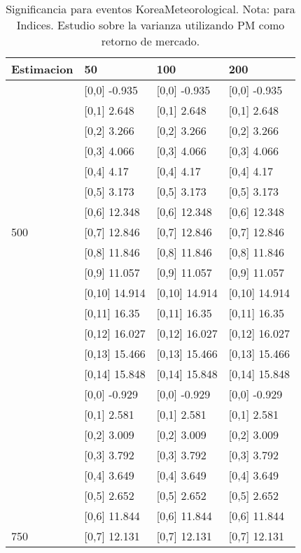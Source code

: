 \begin{table}

\caption{Significancia para eventos KoreaMeteorological. Nota: para Indices. Estudio sobre la varianza utilizando PM como retorno de mercado.}
\centering
\begin{tabular}[t]{llll}
\toprule
Estimacion & 50 & 100 & 200\\
\midrule
 & {}[0,0] -0.935 & {}[0,0] -0.935 & {}[0,0] -0.935\\
 & {}[0,1] 2.648 & {}[0,1] 2.648 & {}[0,1] 2.648\\
 & {}[0,2] 3.266 & {}[0,2] 3.266 & {}[0,2] 3.266\\
 & {}[0,3] 4.066 & {}[0,3] 4.066 & {}[0,3] 4.066\\
 & {}[0,4] 4.17 & {}[0,4] 4.17 & {}[0,4] 4.17\\
\addlinespace
 & {}[0,5] 3.173 & {}[0,5] 3.173 & {}[0,5] 3.173\\
 & {}[0,6] 12.348 & {}[0,6] 12.348 & {}[0,6] 12.348\\
500 & {}[0,7] 12.846 & {}[0,7] 12.846 & {}[0,7] 12.846\\
 & {}[0,8] 11.846 & {}[0,8] 11.846 & {}[0,8] 11.846\\
 & {}[0,9] 11.057 & {}[0,9] 11.057 & {}[0,9] 11.057\\
\addlinespace
 & {}[0,10] 14.914 & {}[0,10] 14.914 & {}[0,10] 14.914\\
 & {}[0,11] 16.35 & {}[0,11] 16.35 & {}[0,11] 16.35\\
 & {}[0,12] 16.027 & {}[0,12] 16.027 & {}[0,12] 16.027\\
 & {}[0,13] 15.466 & {}[0,13] 15.466 & {}[0,13] 15.466\\
 & {}[0,14] 15.848 & {}[0,14] 15.848 & {}[0,14] 15.848\\
\addlinespace
 & {}[0,0] -0.929 & {}[0,0] -0.929 & {}[0,0] -0.929\\
 & {}[0,1] 2.581 & {}[0,1] 2.581 & {}[0,1] 2.581\\
 & {}[0,2] 3.009 & {}[0,2] 3.009 & {}[0,2] 3.009\\
 & {}[0,3] 3.792 & {}[0,3] 3.792 & {}[0,3] 3.792\\
 & {}[0,4] 3.649 & {}[0,4] 3.649 & {}[0,4] 3.649\\
\addlinespace
 & {}[0,5] 2.652 & {}[0,5] 2.652 & {}[0,5] 2.652\\
 & {}[0,6] 11.844 & {}[0,6] 11.844 & {}[0,6] 11.844\\
750 & {}[0,7] 12.131 & {}[0,7] 12.131 & {}[0,7] 12.131\\

\end{tabular}
\end{table}
